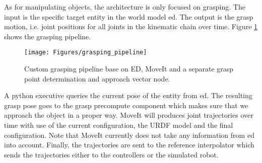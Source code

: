 As for manipulating objects, the architecture is only focused on grasping. The input is the specific target entity in the world model \acrshort{ed}. The output is the grasp motion, i.e. joint positions for all joints in the kinematic chain over time. Figure \ref{fig:grasping_pipeline} shows the grasping pipeline.
\begin{figure}[h]
    \centering
	\texttt{[image: Figures/grasping\_pipeline]}
	\caption{Custom grasping pipeline base on ED, MoveIt and a separate grasp point determination and approach vector node.}
	\label{fig:grasping_pipeline}
\end{figure}
A python executive queries the current pose of the entity from \acrshort{ed}. The resulting grasp pose goes to the grasp precompute component which makes sure that we approach the object in a proper way. MoveIt will produces joint trajectories over time with use of the current configuration, the URDF model and the final configuration. Note that MoveIt currently does not take any information from \acrshort{ed} into account. Finally, the trajectories are sent to the reference interpolator which sends the trajectories either to the controllers or the simulated robot. 
